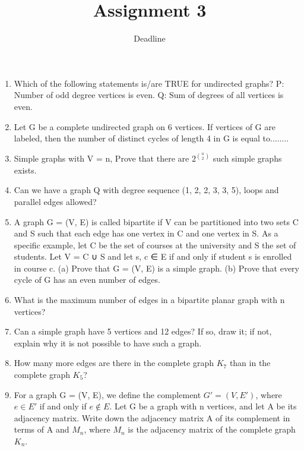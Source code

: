 \documentclass[a4paper]{article}
\title{Assignment 3}
\author{Deadline}
\date{\displaydate{date}}
\begin{document}
\maketitle



\begin{enumerate}
\item Which of the following statements is/are TRUE for undirected graphs?
P: Number of odd degree vertices is even.
Q: Sum of degrees of all vertices is even. 


\item Let G be a complete undirected graph on 6 vertices. If vertices of G are labeled, then the number of distinct cycles of length 4 in G is equal to........  

\item Simple graphs with V = n, Prove that there are 
\begin{math}
2^ {n \choose 2}
\end {math} such simple graphs exists.

\item Can we have a graph Q with degree sequence (1, 2, 2, 3, 3, 5), loops and parallel edges allowed?

\item A graph G = (V, E) is called bipartite if V can be partitioned into two sets C
and S such that each edge has one vertex in C and one vertex in S. As a specific
example, let C be the set of courses at the university and S the set of students.
Let V = C ∪ S and let {s, c} ∈ E if and only if student s is enrolled in course c.
(a) Prove that G = (V, E) is a simple graph.
(b) Prove that every cycle of G has an even number of edges.

\item What is the maximum number of edges in a bipartite planar graph with n vertices?

\item Can a simple graph have 5 vertices and 12 edges? If so, draw it; if not, explain
why it is not possible to have such a graph. 

\item How many more edges are there in the complete graph $K_7$ than in the complete
graph $K_5$?

\item For a graph G = (V, E), we define the complement $G' =
(V, E')$, where $e \in E'$ if and only if $e \notin E$. Let G be a graph with n
vertices, and let A be its adjacency matrix. Write down the adjacency
matrix A of its complement in terms of A and $M_n$, where $M_n$ is the
adjacency matrix of the complete graph $K_n$.


\end{enumerate}
\end{document}
